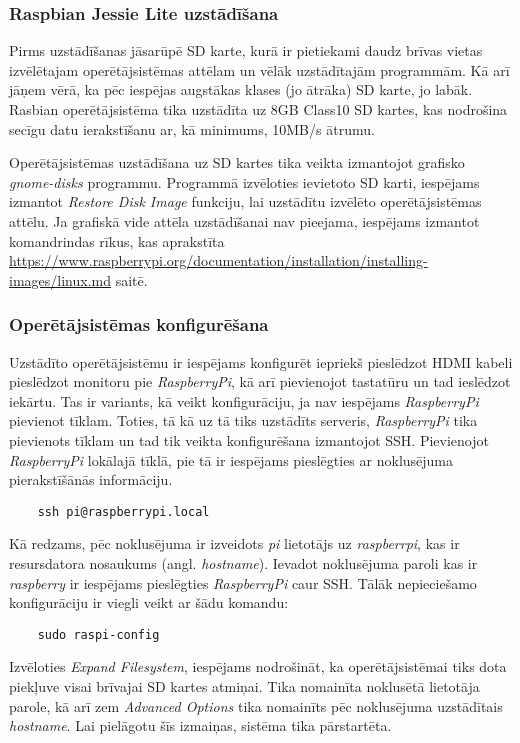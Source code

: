 \subsubsection{Raspbian Jessie Lite uzstādīšana}
Pirms uzstādīšanas jāsarūpē SD karte, kurā ir pietiekami daudz brīvas vietas izvēlētajam operētājsistēmas attēlam un vēlāk uzstādītajām programmām. Kā arī jāņem vērā, ka pēc iespējas augstākas klases (jo ātrāka) SD karte, jo labāk. Rasbian operētājsistēma tika uzstādīta uz 8GB Class10 SD kartes, kas nodrošina secīgu datu ierakstīšanu ar, kā minimums, 10MB/s ātrumu.

Operētājsistēmas uzstādīšana uz SD kartes tika veikta izmantojot grafisko \textit{gnome-disks} programmu. Programmā izvēloties ievietoto SD karti, iespējams izmantot \textit{Restore Disk Image} funkciju, lai uzstādītu izvēlēto operētājsistēmas attēlu.
Ja grafiskā vide attēla uzstādīšanai nav pieejama, iespējams izmantot komandrindas rīkus, kas aprakstīta \url{https://www.raspberrypi.org/documentation/installation/installing-images/linux.md} saitē.

\subsubsection{Operētājsistēmas konfigurēšana}
Uzstādīto operētājsistēmu ir iespējams konfigurēt iepriekš pieslēdzot HDMI kabeli pieslēdzot monitoru pie \textit{RaspberryPi}, kā arī pievienojot tastatūru un tad ieslēdzot iekārtu. Tas ir variants, kā veikt konfigurāciju, ja nav iespējams \textit{RaspberryPi} pievienot tīklam. Toties, tā kā uz tā tiks uzstādīts serveris, \textit{RaspberryPi} tika pievienots tīklam un tad tik veikta konfigurēšana izmantojot SSH.
Pievienojot \textit{RaspberryPi} lokālajā tīklā, pie tā ir iespējams pieslēgties ar noklusējuma pierakstīšānās informāciju.
\begin{lstlisting}
	ssh pi@raspberrypi.local
\end{lstlisting}
Kā redzams, pēc noklusējuma ir izveidots \textit{pi} lietotājs uz \textit{raspberrpi}, kas ir resursdatora nosaukums (angl. \textit{hostname}). Ievadot noklusējuma paroli kas ir \textit{raspberry} ir iespējams pieslēgties \textit{RaspberryPi} caur SSH.
Tālāk nepieciešamo konfigurāciju ir viegli veikt ar šādu komandu:
\begin{lstlisting}
	sudo raspi-config
\end{lstlisting}
Izvēloties \textit{Expand Filesystem}, iespējams nodrošināt, ka operētājsistēmai tiks dota piekļuve visai brīvajai SD kartes atmiņai. Tika nomainīta noklusētā lietotāja parole, kā arī zem \textit{Advanced Options} tika nomainīts pēc noklusējuma uzstādītais \textit{hostname}.
Lai pielāgotu šīs izmaiņas, sistēma tika pārstartēta.

